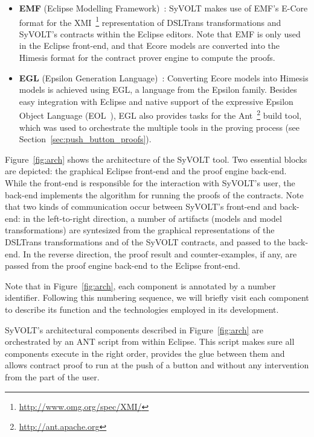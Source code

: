 \begin{itemize}
  \item \textbf{EMF} (Eclipse Modelling Framework)~\cite{emfTool}: SyVOLT makes
  use of EMF's E-Core format for the XMI~\footnote{\url{http://www.omg.org/spec/XMI/}} representation of DSLTrans transformations
  and SyVOLT's contracts within the Eclipse editors. Note that EMF is only used
  in the Eclipse front-end, and that Ecore models are converted into
  the Himesis format for the contract prover engine to compute the
  proofs.\\
  \item \textbf{EGL} (Epsilon Generation Language)~\cite{eglTool}: Converting
  Ecore models into Himesis models is achieved using EGL, a language from the Epsilon
  family. Besides easy integration with Eclipse and native support of the expressive
Epsilon Object Language (EOL~\cite{Kolovos}), EGL also provides tasks for the
Ant~\footnote{\url{http://ant.apache.org}} build tool, which was used to
orchestrate the multiple tools in the proving process (see
Section~\ref{sec:push_button_proofs}).\\
\end{itemize}


Figure~\ref{fig:arch} shows the architecture of the SyVOLT tool. Two essential
blocks are depicted: the graphical Eclipse front-end and the proof engine
back-end. While the front-end is responsible for the interaction with SyVOLT's
user, the back-end implements the algorithm for running the proofs of the contracts. Note
that two kinds of communication occur between SyVOLT's front-end and back-end:
in the left-to-right direction, a number of artifacts (models and model
transformations) are syntesized from the graphical representations of the
DSLTrans transformations and of the SyVOLT contracts, and passed to the
back-end.
In the reverse direction, the proof result and counter-examples, if any, are
passed from the proof engine back-end to the Eclipse front-end.

Note that in Figure~\ref{fig:arch}, each component is annotated by a number
identifier. Following this numbering sequence, we will briefly visit each
component to describe its function and the technologies employed in its development.

SyVOLT's architectural components described in Figure~\ref{fig:arch} are
orchestrated by an ANT script from within Eclipse. This script makes sure all components execute in the
right order, provides the glue between them and allows contract proof to run at
the push of a button and without any intervention from the part of the user.


